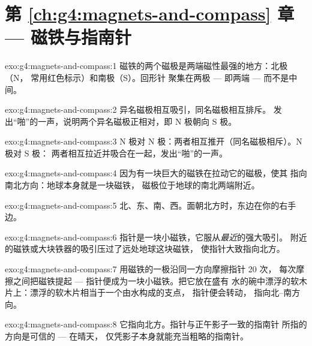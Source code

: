 \section*{第 \ref{ch:g4:magnets-and-compass} 章 --- 磁铁与指南针}

\begin{solution}{exo:g4:magnets-and-compass:1}
磁铁的两个磁极是两端磁性最强的地方：北极（N，
常用红色标示）和南极（S）。回形针
聚集在两极 --- 即两端 --- 而不是中间。
\end{solution}

\begin{solution}{exo:g4:magnets-and-compass:2}
异名磁极相互吸引，同名磁极相互排斥。
发出“啪”的一声，说明两个异名磁极正相对，即 N 极朝向 S 极。
\end{solution}

\begin{solution}{exo:g4:magnets-and-compass:3}
N 极对 N 极：两者相互推开（同名磁极相斥）。N 极对 S 极：
两者相互拉近并吸合在一起，发出“啪”的一声。
\end{solution}

\begin{solution}{exo:g4:magnets-and-compass:4}
因为有一块巨大的磁铁在拉动它的磁极，使其
指向南北方向：地球本身就是一块磁铁，
磁极位于地球的南北两端附近。
\end{solution}

\begin{solution}{exo:g4:magnets-and-compass:5}
北、东、南、西。面朝北方时，东边在你的右手边。
\end{solution}

\begin{solution}{exo:g4:magnets-and-compass:6}
指针是一块小磁铁，它服从\emph{最近}的强大吸引。
附近的磁铁或大块铁器的吸引压过了远处地球这块磁铁，
使指针大致指向北方。
\end{solution}

\begin{solution}{exo:g4:magnets-and-compass:7}
用磁铁的一极沿同一方向摩擦指针 20 次，
每次摩擦之间把磁铁提起 --- 指针便成为一块小磁铁。把它放在盛有
水的碗中漂浮的软木片上：漂浮的软木片相当于一个由水构成的支点，
指针便会转动，
指向北--南方向。
\end{solution}

\begin{solution}{exo:g4:magnets-and-compass:8}
它指向北方。指针与正午影子一致的指南针
所指的方向是可信的 --- 在晴天，
仅凭影子本身就能充当粗略的指南针。
\end{solution}


